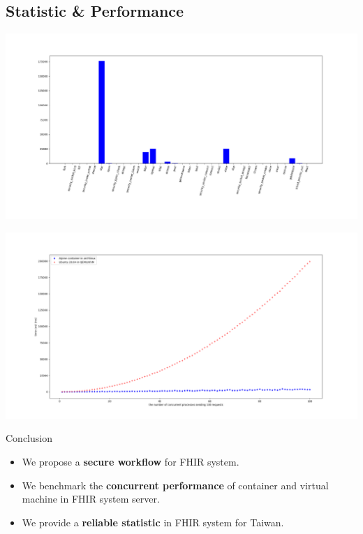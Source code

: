 \documentclass{beamer}
\begin{document}
\begin{CJK*}{UTF8}{bsmi}
    \section{Statistic \& Performance}
    \begin{frame}
        \centering
        \includegraphics[width=\textwidth, height=\textheight]{hist.png}
    \end{frame}
    \begin{frame}
        \centering
        \includegraphics[width=\textwidth, height=\textheight]{concurrent.png}
    \end{frame}

    \begin{frame}{Conclusion}
        \begin{itemize}
            \item We propose a {\color{secureColor} \textbf{secure workflow}} for FHIR system.
            \item We benchmark the {\color{secureColor} \textbf{concurrent performance}} of container and virtual machine in FHIR system server.
            \item We provide a {\color{secureColor} \textbf{reliable statistic}} in FHIR system for Taiwan.
        \end{itemize}
    \end{frame}

\end{CJK*}
\end{document}
